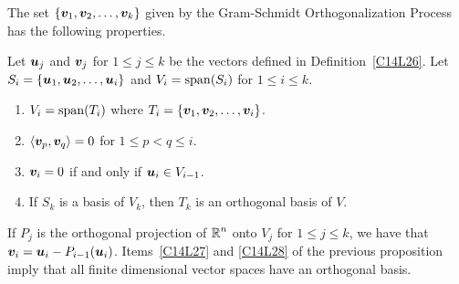 The set $\{\bm{v}_1, \bm{v}_2, \ldots , \bm{v}_k\}$ given by the
Gram-Schmidt Orthogonalization Process has the following properties.

\begin{prop}
Let $\bm{u}_j$ and $\bm{v}_j$ for $1\leq j\leq k$ be the vectors
defined in Definition~\ref{C14L26}.  Let 
$S_i = \{\bm{u}_1, \bm{u}_2, \ldots , \bm{u}_i\}$
and $V_i = \operatorname{span}(S_i)$ for $1\leq i \leq k$.
\begin{enumerate}
\item $V_i = \operatorname{span}(T_i)$ where
$T_i = \{\bm{v}_1, \bm{v}_2, \ldots , \bm{v}_i\}$.
\item $\left\langle{\bm{v}_p} , {\bm{v}_q}\right\rangle = 0$ for $1 \leq p < q \leq i$.
\label{C14L27}
\item $\bm{v}_i = 0$ if and only if $\bm{u}_i \in V_{i-1}$.
\item If $S_k$ is a basis of $V_k$, then $T_k$ is an orthogonal basis of
$V$. \label{C14L28}
\end{enumerate}
\end{prop}

\begin{rmk}
If $P_j$ is the orthogonal projection of $\displaystyle \mathbb{R}^n$ onto $V_j$ for
$1 \leq j \leq k$, we have that
$\bm{v}_i = \bm{u}_i - P_{i-1}(\bm{u}_i)$.
Items~\ref{C14L27} and \ref{C14L28} of the previous proposition
imply that all finite dimensional vector spaces have an orthogonal
basis.
\end{rmk}

